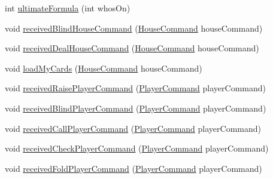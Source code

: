\begin{DoxyCompactItemize}
\item 
int \hyperlink{classhu_1_1elte_1_1bfw1p6_1_1poker_1_1client_1_1view_1_1_abstract_main_view_ace2db1457413bbe48cec4d070e7a5fa1}{ultimate\+Formula} (int whos\+On)
\item 
void \hyperlink{classhu_1_1elte_1_1bfw1p6_1_1poker_1_1client_1_1view_1_1_abstract_main_view_adcd888fbf0bcf75bbc525d4a36ea9338}{received\+Blind\+House\+Command} (\hyperlink{classhu_1_1elte_1_1bfw1p6_1_1poker_1_1command_1_1_house_command}{House\+Command} house\+Command)
\item 
void \hyperlink{classhu_1_1elte_1_1bfw1p6_1_1poker_1_1client_1_1view_1_1_abstract_main_view_a52761890ca0caeffdd2838f4c614796c}{received\+Deal\+House\+Command} (\hyperlink{classhu_1_1elte_1_1bfw1p6_1_1poker_1_1command_1_1_house_command}{House\+Command} house\+Command)
\item 
void \hyperlink{classhu_1_1elte_1_1bfw1p6_1_1poker_1_1client_1_1view_1_1_abstract_main_view_a83173421a07ab054e3bc311a7c8b3a18}{load\+My\+Cards} (\hyperlink{classhu_1_1elte_1_1bfw1p6_1_1poker_1_1command_1_1_house_command}{House\+Command} house\+Command)
\item 
void \hyperlink{classhu_1_1elte_1_1bfw1p6_1_1poker_1_1client_1_1view_1_1_abstract_main_view_ae11f23ad7101682a4564689bac386ed5}{received\+Raise\+Player\+Command} (\hyperlink{classhu_1_1elte_1_1bfw1p6_1_1poker_1_1command_1_1_player_command}{Player\+Command} player\+Command)
\item 
void \hyperlink{classhu_1_1elte_1_1bfw1p6_1_1poker_1_1client_1_1view_1_1_abstract_main_view_a1a55d21536c236a2fed137c72fcb0607}{received\+Blind\+Player\+Command} (\hyperlink{classhu_1_1elte_1_1bfw1p6_1_1poker_1_1command_1_1_player_command}{Player\+Command} player\+Command)
\item 
void \hyperlink{classhu_1_1elte_1_1bfw1p6_1_1poker_1_1client_1_1view_1_1_abstract_main_view_a7d033d03256f2304c1b21e90ca6cdc05}{received\+Call\+Player\+Command} (\hyperlink{classhu_1_1elte_1_1bfw1p6_1_1poker_1_1command_1_1_player_command}{Player\+Command} player\+Command)
\item 
void \hyperlink{classhu_1_1elte_1_1bfw1p6_1_1poker_1_1client_1_1view_1_1_abstract_main_view_a303820b9171bf489f9a330a0116c56ca}{received\+Check\+Player\+Command} (\hyperlink{classhu_1_1elte_1_1bfw1p6_1_1poker_1_1command_1_1_player_command}{Player\+Command} player\+Command)
\item 
void \hyperlink{classhu_1_1elte_1_1bfw1p6_1_1poker_1_1client_1_1view_1_1_abstract_main_view_af6d0d8c1986d11b4fd641cb0e7cff135}{received\+Fold\+Player\+Command} (\hyperlink{classhu_1_1elte_1_1bfw1p6_1_1poker_1_1command_1_1_player_command}{Player\+Command} player\+Command)

\end{DoxyCompactItemize}
